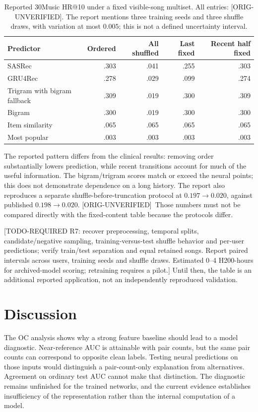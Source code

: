 \documentclass[10pt]{article}
\newcommand{\prov}[1]{{\color{black!65}\scriptsize[#1]}}
\newcommand{\ou}{\prov{ORIG-UNVERIFIED}}
\newcommand{\req}[2]{{\color{brown!75!black}\small[TODO-REQUIRED #1: #2]}}
\begin{document}
\begin{table}[H]
\centering\small
\caption{Reported 30Music HR@10 under a fixed visible-song multiset. All entries: \ou. The report mentions three training seeds and three shuffle draws, with variation at most $0.005$; this is not a defined uncertainty interval.}
\label{tab:music}
\begin{tabular}{@{}lrrrr@{}}\toprule
Predictor & Ordered & All shuffled & Last fixed & Recent half fixed \\\midrule
SASRec & .303 & .041 & .255 & .303 \\
GRU4Rec & .278 & .029 & .099 & .274 \\
Trigram with bigram fallback & .309 & .019 & .300 & .309 \\
Bigram & .300 & .019 & .300 & .300 \\
Item similarity & .065 & .065 & .065 & .065 \\
Most popular & .003 & .003 & .003 & .003 \\
\bottomrule\end{tabular}
\end{table}

The reported pattern differs from the clinical results: removing order substantially lowers prediction, while recent transitions account for much of the useful information. The bigram/trigram scores match or exceed the neural points; this does not demonstrate dependence on a long history. The report also reproduces a separate shuffle-before-truncation protocol at $0.197\to0.020$, against published $0.198\to0.020$. \ou\ Those numbers must not be compared directly with the fixed-content table because the protocols differ.

\req{R7}{recover preprocessing, temporal splits, candidate/negative sampling, training-versus-test shuffle behavior and per-user predictions; verify train/test separation and equal retained songs. Report paired intervals across users, training seeds and shuffle draws. Estimated 0--4 H200-hours for archived-model scoring; retraining requires a pilot.} Until then, the table is an additional reported application, not an independently reproduced validation.

\section{Discussion}
The OC analysis shows why a strong feature baseline should lead to a model diagnostic. Near-reference AUC is attainable with pair counts, but the same pair counts can correspond to opposite clean labels. Testing neural predictions on those inputs would distinguish a pair-count-only explanation from alternatives. Agreement on ordinary test AUC cannot make that distinction. The diagnostic remains unfinished for the trained networks, and the current evidence establishes insufficiency of the representation rather than the internal computation of a model.
\end{document}

